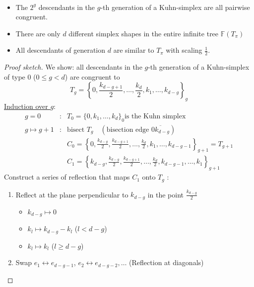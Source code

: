 \begin{theorem}\
	\begin{itemize}
		\item The $2^g$ descendants in the $g$-th generation of a Kuhn-simplex are all pairwise congruent.
		\item There are only $d$ different simplex shapes in the entire infinite tree $\mathbb{F}(T_{\pi})$
		\item All descendants of generation $d$ are similar to $T_{\pi}$ with scaling $\frac{1}{2}$.
			
	\end{itemize}
\end{theorem}
\begin{proof}[Proof sketch]
	We show: all descendants in the $g$-th generation of a Kuhn-simplex of type $0$ ($0 \leq g < d$) are congruent to
	\begin{equation*}
    T_{g}= \left\{0, \frac{k_{d-g+1}}{2},\dots ,\frac{k_{d}}{2},k_{1},\dots ,k_{d-g} \right\}_{g}
	\end{equation*}
	\underline{Induction over $g$}:
	\begin{align*}
		g=0&: & T_{0}= \{0,k_{1},\dots ,k_{d} \}_{0} \text{is the Kuhn simplex}\\
		g\mapsto g+1&: &\text{bisect } T_{g}\quad ( \text{bisection edge } \overline{0k_{d-g}})\\
		 && C_{0}= \left\{ 0, \frac{k_{d-g}}{2},\frac{k_{d-g+1}}{2},\dots , \frac{k_{d}}{2},k_{1},\dots ,k_{d-g-1}\right\}_{g+1}= T_{g+1}\\
     && C_{1}= \left\{ k_{d-g}, \frac{k_{d-g}}{2},\frac{k_{d-g+1}}{2},\dots , \frac{k_{d}}{2},k_{d-g-1},\dots ,k_{1} \right\}_{g+1} %
	\end{align*}
	Construct a series of reflection that maps $C_{1}$ onto $T_{g}$ :
	\begin{enumerate}
		\item Reflect at the plane perpendicular to $k_{d-g}$ in the point $\frac{k_{d-g}}{2}$
			\begin{itemize}
				\item $k_{d-g} \mapsto 0$
				\item $k_{l} \mapsto k_{d-g}-k_{l}$ ($l < d-g$)
				\item $k_{l} \mapsto k_{l}$ ($l \geq d-g$)
			\end{itemize}
    \item Swap $e_{1}\leftrightarrow e_{d-g-1}$, $e_{2} \leftrightarrow e_{d-g-2},\dots $ (Reflection at diagonals)

\end{enumerate}
\end{proof}
